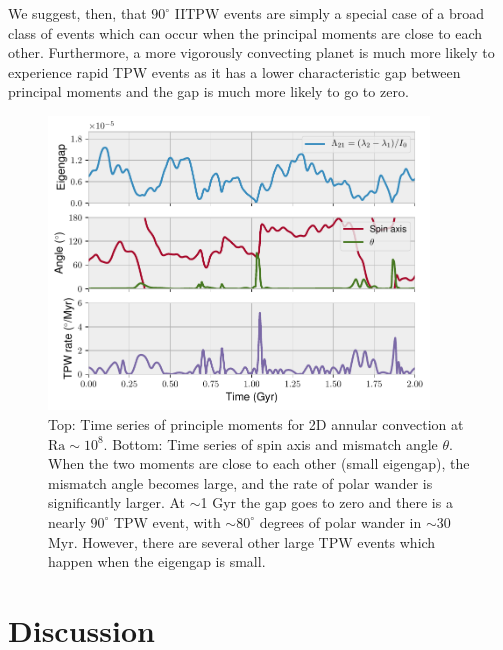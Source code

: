 \documentclass[extra,mreferee]{gji}
\begin{document}
We suggest, then, that $90^\circ$ IITPW events are simply a special case of a broad class of events which can occur
when the principal moments are close to each other.  Furthermore, a more vigorously convecting planet is much more likely to experience rapid TPW events
as it has a lower characteristic gap between principal moments and the gap is much more likely to go to zero.

\begin{figure}
\centering
\includegraphics[width=0.9\textwidth]{figures/misfit.pdf}
\caption{Top: Time series of principle moments for 2D annular convection at $\mathrm{Ra}\sim10^8$.  Bottom: Time series of spin axis and mismatch angle $\theta$.  When the two moments are close to each other (small eigengap), the mismatch angle becomes large, and the rate of polar wander is significantly larger. At $\sim$1 Gyr the gap goes to zero and there is a nearly $90^\circ$ TPW event, with $\sim80^\circ$ degrees of polar wander in $\sim$30 Myr. However, there are several other large TPW events which happen when the eigengap is small.}
\label{fig:misfit}
\end{figure}


\section{Discussion}
\label{sec:discussion}
\end{document}
